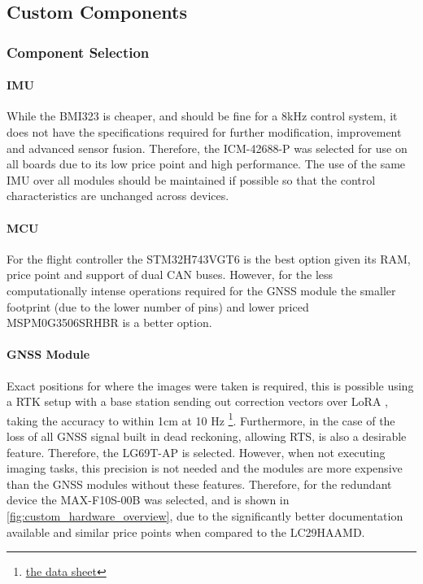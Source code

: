 \subsection{Custom Components}

\subsubsection{Component Selection}

\paragraph{\gls{IMU}}
While the BMI323 is cheaper, and should be fine for a 8kHz control system, it does not have the specifications required for further modification, improvement and advanced sensor fusion. Therefore, the ICM-42688-P was selected for use on all boards due to its low price point and high performance. The use of the same \gls{IMU} over all modules should be maintained if possible so that the control characteristics are unchanged across devices.
\paragraph{\gls{MCU}}
For the flight controller the STM32H743VGT6 is the best option given its \gls{RAM}, price point and support of dual \gls{CAN} buses. However, for the less computationally intense operations required for the \gls{GNSS} module the smaller footprint (due to the lower number of pins) and lower priced MSPM0G3506SRHBR is a better option.
\paragraph{\gls{GNSS} Module}
Exact positions for where the images were taken is required, this is possible using a \gls{RTK} setup with a base station sending out correction vectors over LoRA \cite{a source}, taking the accuracy to within 1cm at 10 Hz \footnote{\url{the data sheet}}. Furthermore, in the case of the loss of all \gls{GNSS} signal built in dead reckoning, allowing \gls{RTS}, is also a desirable feature. Therefore, the LG69T-AP is selected. However, when not executing imaging tasks, this precision is not needed and the modules are more expensive than the \gls{GNSS} modules without these features. Therefore, for the redundant device the MAX-F10S-00B was selected, and is shown in \ref{fig:custom_hardware_overview}, due to the significantly better documentation available and similar price points when compared to the LC29HAAMD.

